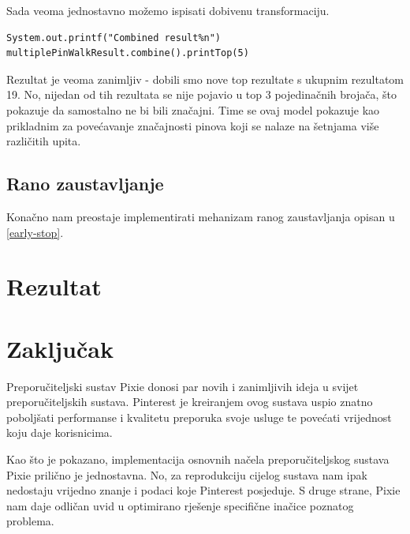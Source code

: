 \documentclass[times, utf8, seminar]{fer}
\begin{document}
Sada veoma jednostavno možemo ispisati dobivenu transformaciju.

\begin{lstlisting}
System.out.printf("Combined result%n")
multiplePinWalkResult.combine().printTop(5)
\end{lstlisting}

Rezultat je veoma zanimljiv - dobili smo nove top rezultate s ukupnim rezultatom 19. No, nijedan od tih rezultata se nije pojavio u top 3 pojedinačnih brojača, što pokazuje da samostalno ne bi bili značajni. Time se ovaj model pokazuje kao prikladnim za povećavanje značajnosti pinova koji se nalaze na šetnjama više različitih upita.

\section{Rano zaustavljanje}

Konačno nam preostaje implementirati mehanizam ranog zaustavljanja opisan u \ref{early-stop}.

\chapter{Rezultat}

\chapter{Zaključak}

Preporučiteljski sustav Pixie donosi par novih i zanimljivih ideja u svijet preporučiteljskih sustava. Pinterest je kreiranjem ovog sustava uspio znatno poboljšati performanse i kvalitetu preporuka svoje usluge te povećati vrijednost koju daje korisnicima.

Kao što je pokazano, implementacija osnovnih načela preporučiteljskog sustava Pixie prilično je jednostavna. No, za reprodukciju cijelog sustava nam ipak nedostaju vrijedno znanje i podaci koje Pinterest posjeduje. S druge strane, Pixie nam daje odličan uvid u optimirano rješenje specifične inačice poznatog problema.



\end{document}
